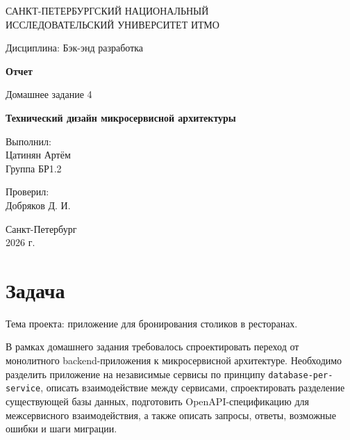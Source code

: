 \documentclass[14pt,a4paper]{extarticle}
\newcommand{\code}[1]{\texttt{#1}}
\begin{document}
\begin{titlepage}
    \begin{center}
        САНКТ-ПЕТЕРБУРГСКИЙ НАЦИОНАЛЬНЫЙ\\
        ИССЛЕДОВАТЕЛЬСКИЙ УНИВЕРСИТЕТ ИТМО

        \vspace{1.5cm}

        Дисциплина: Бэк-энд разработка

        \vspace{1.5cm}

        \textbf{Отчет}

        \vspace{0.5cm}

        Домашнее задание 4

        \vspace{0.5cm}

        \textbf{Технический дизайн микросервисной архитектуры}

        \vfill

        \begin{flushright}
            Выполнил:\\
            Цатинян Артём\\
            Группа БР1.2

            \vspace{0.8cm}

            Проверил:\\
            Добряков Д. И.
        \end{flushright}

        \vfill

        Санкт-Петербург\\
        2026 г.
    \end{center}
\end{titlepage}

\section{Задача}

Тема проекта: приложение для бронирования столиков в ресторанах.

В рамках домашнего задания требовалось спроектировать переход от монолитного backend-приложения к микросервисной архитектуре. Необходимо разделить приложение на независимые сервисы по принципу \code{database-per-service}, описать взаимодействие между сервисами, спроектировать разделение существующей базы данных, подготовить OpenAPI-спецификацию для межсервисного взаимодействия, а также описать запросы, ответы, возможные ошибки и шаги миграции.
\end{document}
